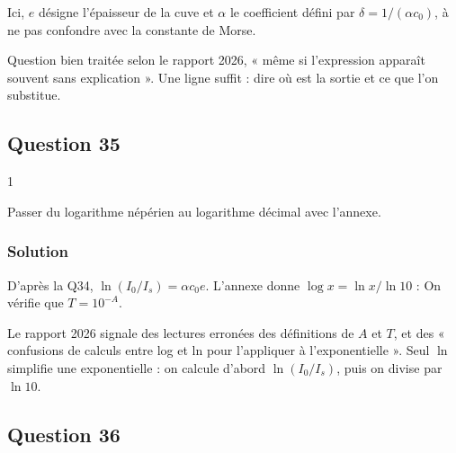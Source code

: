 \documentclass[11pt,a4paper]{article}
\newcommand{\equationajustee}[1]{%
  \sbox{\boiteequation}{$\displaystyle #1$}%
  \ifdim\wd\boiteequation>\linewidth
    \[\resizebox{\linewidth}{!}{\usebox{\boiteequation}}\]%
  \else
    \[#1\]%
  \fi}
\begin{document}
Ici, \(e\) désigne l'épaisseur de la cuve et \(\alpha\) le coefficient défini par \(\delta=1/(\alpha c_0)\), à ne pas confondre avec la constante de Morse.

\begin{jury}

Question bien traitée selon le rapport 2026, « même si l'expression apparaît souvent sans explication ». Une ligne suffit : dire où est la sortie et ce que l'on substitue.

\end{jury}

\hypertarget{question-35}{%
\subsection{Question 35}\label{question-35}}

\begin{indication}{1}

Passer du logarithme népérien au logarithme décimal avec l'annexe.

\end{indication}

\hypertarget{solution-34}{%
\subsubsection{Solution}\label{solution-34}}

D'après la Q34, \(\ln(I_0/I_s)=\alpha c_0e\). L'annexe donne \(\log x=\ln x/\ln10\) :
\equationajustee{\boxed{\begin{aligned}
A&=\frac{\alpha c_0e}{\ln10}\\
T&=\exp(-\alpha c_0e)
\end{aligned}}}
On vérifie que \(T=10^{-A}\).

\begin{piege}

Le rapport 2026 signale des lectures erronées des définitions de \(A\) et \(T\), et des « confusions de calculs entre log et ln pour l'appliquer à l'exponentielle ». Seul \(\ln\) simplifie une exponentielle : on calcule d'abord \(\ln(I_0/I_s)\), puis on divise par \(\ln10\).

\end{piege}

\hypertarget{question-36}{%
\subsection{Question 36}\label{question-36}}
\end{document}
